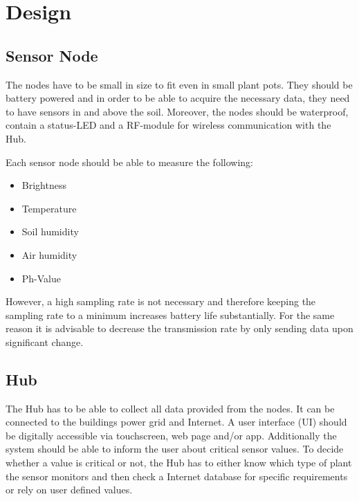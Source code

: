 \documentclass[conference]{IEEEtran}
\begin{document}

 





\endgroup



\endgroup

\section{Design}
\subsection{Sensor Node}
The nodes have to be small in size to fit even in small plant pots. They should be battery powered and in order to be able to acquire the necessary data, they need to have sensors in and above the soil. Moreover, the nodes should be waterproof, contain a status-LED and a RF-module for wireless communication with the Hub.

Each sensor node should be able to measure the following:
\begin{itemize}
	\item Brightness
	\item Temperature
	\item Soil humidity
	\item Air humidity
	\item Ph-Value
\end{itemize}

However, a high sampling rate is not necessary and therefore keeping the sampling rate to a minimum increases battery life substantially. For the same reason it is advisable to decrease the transmission rate by only sending data upon significant change.

\subsection{Hub}
The Hub has to be able to collect all data provided from the nodes. It can be connected to the buildings power grid and Internet. A user interface (UI) should be digitally accessible via touchscreen, web page and/or app. Additionally the system should be able to inform the user about critical sensor values. To decide whether a value is critical or not, the Hub has to either know which type of plant the sensor monitors and then check a Internet database for specific requirements or rely on user defined values.
\end{document}
